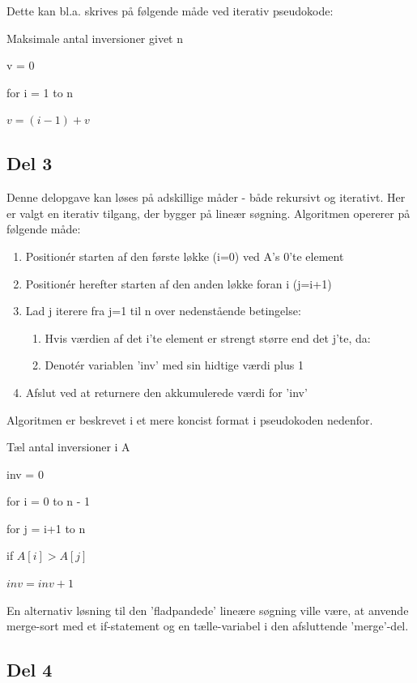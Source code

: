 \documentclass[a4paper,10pt]{article}
\begin{document}
Dette kan bl.a. skrives på følgende måde ved iterativ pseudokode:

\begin{algorithm}
\caption{Maksimale antal inversioner givet n}
\begin{algorithmic}[1]
\State \parbox[t]{.7\linewidth}{v = 0}
\State \parbox[t]{.7\linewidth}{for i = 1 to n}
\Indent
\State \parbox[t]{.7\linewidth}{$v = (i-1) + v$}
\EndIndent
\State {}
\EndFunction
\end{algorithmic}
\end{algorithm}

\subsection*{Del 3}

Denne delopgave kan løses på adskillige måder - både rekursivt og iterativt. Her er valgt en iterativ tilgang, der bygger på lineær søgning. Algoritmen opererer på følgende måde:

\begin{enumerate}
\item{Positionér starten af den første løkke (i=0) ved A's 0'te element}
\item{Positionér herefter starten af den anden løkke foran i (j=i+1)}
\item{Lad j iterere fra j=1 til n over nedenstående betingelse:}
\begin{enumerate}
\item{Hvis værdien af det i'te element er strengt større end det j'te, da:}
\item{Denotér variablen 'inv' med sin hidtige værdi plus 1}
\end{enumerate}
\item{Afslut ved at returnere den akkumulerede værdi for 'inv'}
\end{enumerate}

\pagebreak

Algoritmen er beskrevet i et mere koncist format i pseudokoden nedenfor. 

\begin{algorithm}
\caption{Tæl antal inversioner i A}
\begin{algorithmic}[2]
\State \parbox[t]{.7\linewidth}{inv = 0}
\State \parbox[t]{.7\linewidth}{for i = 0 to n - 1}
\Indent
\State \parbox[t]{.7\linewidth}{for j = i+1 to n}
\Indent
\State \parbox[t]{.7\linewidth}{if $A[i] > A[j]$}
\State \parbox[t]{.7\linewidth}{$inv = inv + 1$}
\EndIndent
\EndIndent
\State {}
\EndFunction
\end{algorithmic}
\end{algorithm}

En alternativ løsning til den 'fladpandede' lineære søgning ville være, at anvende merge-sort med et if-statement og en tælle-variabel i den afsluttende 'merge'-del.

\subsection*{Del 4}
\end{document}
